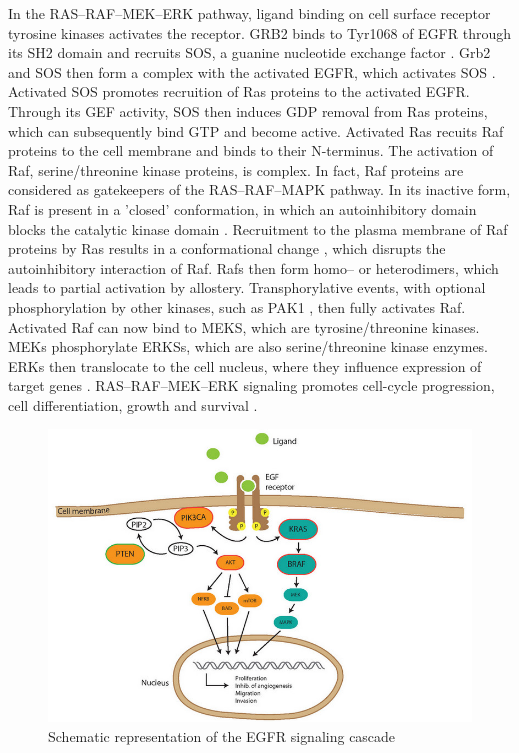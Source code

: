 {{{    In the RAS--RAF--MEK--ERK pathway, ligand binding on cell surface receptor
    tyrosine kinases activates the receptor.
    GRB2 binds to Tyr1068 of EGFR through its SH2 domain and recruits SOS, a
    guanine nucleotide exchange factor {\cite{grb2}}. Grb2 and SOS then form a
    complex with the activated EGFR, which activates SOS {\cite{grb2}}.
    Activated SOS promotes recruition of Ras proteins to the activated EGFR.
    Through its GEF activity, SOS then induces GDP removal from Ras proteins,
    which can subsequently bind GTP and become active. Activated Ras recuits Raf
    proteins to the cell membrane and binds to their N-terminus. The activation
    of Raf, serine/threonine kinase proteins, is complex. In fact, Raf proteins
    are considered as gatekeepers of the RAS--RAF--MAPK pathway. In its inactive
    form, Raf is present in a 'closed' conformation, in which an autoinhibitory
    domain blocks the catalytic kinase domain {\cite{raf}}. Recruitment to the
    plasma membrane of Raf proteins by Ras results in a conformational change
    {\cite{raf_2}}, which disrupts the autoinhibitory interaction of Raf. Rafs
    then form homo-- or heterodimers, which leads to partial activation by
    allostery. Transphorylative events, with optional phosphorylation by other
    kinases, such as PAK1 {\cite{pak1}}, then fully activates Raf. Activated Raf
    can now bind to MEKS, which are tyrosine/threonine kinases. MEKs
    phosphorylate ERKSs, which are also serine/threonine kinase enzymes. ERKs
    then translocate to the cell nucleus, where they influence expression of
    target genes {\cite{pak1}}. RAS--RAF--MEK--ERK signaling promotes cell-cycle
    progression, cell differentiation, growth and survival {\cite{pak1}}.

    \begin{figure}[ht]
      \begin{center}
        \includegraphics[scale=2.5,angle=0]{egfr_signaling.png}
        \caption{Schematic representation of the EGFR signaling cascade}
      \end{center}
    \end{figure}

}}}

